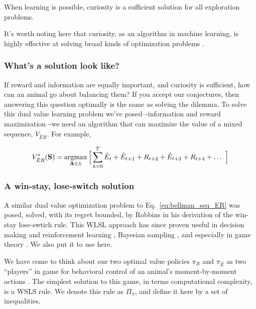 \begin{conjecture}
	When learning is possible, curiosity is a sufficient solution for all exploration problems.
\end{conjecture}

It's worth noting here that curiosity, as an algorithm in machine learning, is highly effective at solving broad kinds of optimization problems \cite{Schmidhuber1991,Stanton2018,Lehman2010,Mouret2011,Fister2019,Mouret2015,Colas2020,Cully2015,Pathak2017,Laversanne-Finot2018}. 

\subsubsection*{What's a solution look like?}
If reward and information are equally important, and curiosity is sufficient, how can an animal go about balancing them? If you accept our conjectures, then answering this question optimally is the same as solving the dilemma. To solve this dual value learning problem we’ve posed–-information and reward maximization–-we need an algorithm that can maximize the value of a mixed sequence, $V_{\hat{E}R}$. For example,

\begin{equation}
	\label{eq:bellman_seq_ER}
	V^*_{\hat{E}R}(\mathbf{S}) = \operatorname*{argmax}_{\mathbf{A} \in \mathbb{A}} \Big [\sum_{k=0}^{T} \hat{E}_t + \hat{E}_{t+1} + R_{t+2} + \hat{E}_{t+3} + R_{t+4} + \ldots  \ \Big ]
\end{equation}

\subsubsection*{A win-stay, lose-switch solution}
A similar dual value optimization problem to Eq.~\ref{eq:bellman_seq_ER} was posed, solved, with its regret bounded, by Robbins \cite{Robbins1952} in his derivation of the win-stay lose-swtich rule. This WLSL approach has since proven uesful in decision making and reinforcement learning \cite{Estes1994TowardAS,Worthy2014}, Bayesian sampling \cite{Bonawitz2014}, and especially in game theory \cite{Nowak1993}. We also put it to use here. 

We have come to think about our two optimal value policies $\pi_R$ and $\pi_{\hat E}$ as two ``players'' in game for behavioral control of an animal's moment-by-moment actions \cite{Estes1994TowardAS}. The simplest solution to this game, in terms computational complexity, is a WSLS rule. We denote this rule as $\Pi_\pi$, and define it here by a set of inequalities,

